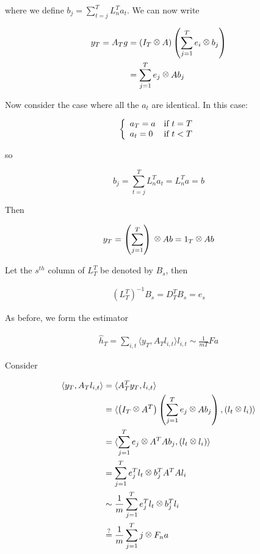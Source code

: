 where we define \(b_j = \sum_{t=j}^T L_n^T a_t\). We can now write

\begin{align*}
y_T = A_Tg &= \left(I_T \kronecker A \right) \left(\sum_{j=1}^T e_i \kronecker b_j\right)\\
&= \sum_{j=1}^T e_j \kronecker Ab_j
\end{align*}

\begin{example}[Identical \(a_t\)]
Now consider the case where all the \(a_t\) are identical. In this case:

\begin{equation}
\left\{ \begin{array}{ll} a_T = a & \mbox{if } t=T \\ a_t = 0 & \mbox{if } t < T \end{array} \right.
\end{equation}

so

\begin{equation}
b_j = \sum_{t=j}^T L_n^T a_t = L_n^T a = b
\end{equation}

Then

\begin{equation}
y_T = \left( \sum_{j=1}^T \right) \kronecker Ab = 1_T \kronecker Ab
\end{equation}
\end{example}

Let the \(s^{th}\) column of \(L_T^T\) be denoted by \(B_s\), then

\begin{align*}
\left(L_T^T\right)^{-1}B_s = D_T^T B_s = e_s
\end{align*}

As before, we form the estimator

\begin{align*}
\hat{h}_T = \sum_{i,t} \langle y_T, A_T l_{i,t} \rangle l_{i,t} \sim \frac{1}{mT} Fa
\end{align*}

Consider 

\begin{align*}
\langle y_T, A_T l_{i,t} \rangle &= \langle A_T^T y_T,l_{i,t} \rangle \\
&= \langle \left(I_T \kronecker A^T\right)\left(\sum_{j=1}^T e_j \kronecker Ab_j\right), \left(l_t \kronecker l_i\right)\rangle \\
&= \langle \sum_{j=1}^T e_j \kronecker A^TAb_j, \left(l_t \kronecker l_i\right)\rangle \\
&= \sum_{j=1}^T e_j^T l_t \kronecker b_j^TA^TAl_i \\
&\sim \frac{1}{m}\sum_{j=1}^T e_j^T l_t \kronecker b_j^Tl_i\\
&\stackrel{?}{=} \frac{1}{m}\sum_{j=1}^T j \kronecker F_n a
\end{align*}

